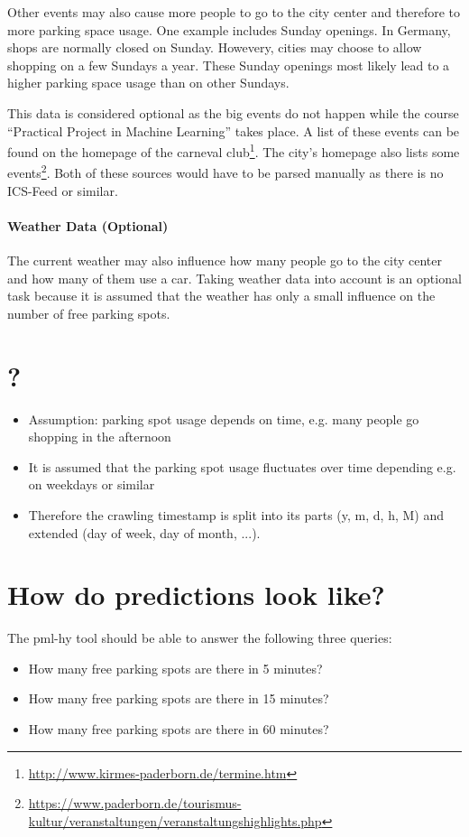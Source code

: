 \documentclass[journal,10pt]{IEEEtran}
\begin{document}
Other events may also cause more people to go to the city center and therefore to more parking space usage. One example includes Sunday openings. In Germany, shops are normally closed on Sunday. Howevery, cities may choose to allow shopping on a few Sundays a year. These Sunday openings most likely lead to a higher parking space usage than on other Sundays.

This data is considered optional as the big events do not happen while the course ``Practical Project in Machine Learning'' takes place. A list of these events can be found on the homepage of the carneval club\footnote{\url{http://www.kirmes-paderborn.de/termine.htm}}. The city's homepage also lists some events\footnote{\url{https://www.paderborn.de/tourismus-kultur/veranstaltungen/veranstaltungshighlights.php}}. Both of these sources would have to be parsed manually as there is no ICS-Feed or similar. 

\paragraph{Weather Data (Optional)}

The current weather may also influence how many people go to the city center and how many of them use a car. Taking weather data into account is an optional task because it is assumed that the weather has only a small influence on the number of free parking spots.


\section{?}

\begin{itemize}
 \item Assumption: parking spot usage depends on time, e.g. many people go shopping in the afternoon
 \item It is assumed that the parking spot usage fluctuates over time depending e.g. on weekdays or similar
 \item Therefore the crawling timestamp is split into its parts (y, m, d, h, M) and extended (day of week, day of month, ...).
\end{itemize}

\section{How do predictions look like?}

The pml-hy tool should be able to answer the following three queries:
\begin{itemize}
 \item How many free parking spots are there in 5 minutes?
 \item How many free parking spots are there in 15 minutes?
 \item How many free parking spots are there in 60 minutes?
\end{itemize}




\end{document}
